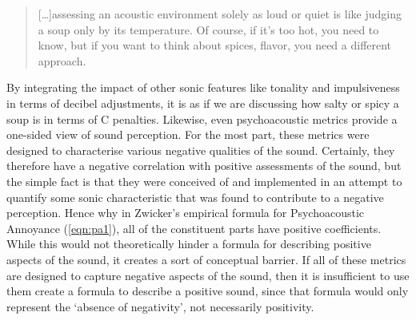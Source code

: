 \begin{samepage}
\begin{quote}
  [\ldots]assessing an acoustic environment solely as loud or quiet is like judging a soup only by its temperature. Of course, if it's too hot, you need to know, but if you want to think about spices, flavor, you need a different approach.
  \begin{flushright}
    \citet{OSullivan2021Pandemic}
  \end{flushright}
\end{quote}
\end{samepage}

By integrating the impact of other sonic features like tonality and impulsiveness in terms of decibel adjustments, it is as if we are discussing how salty or spicy a soup is in terms of \textdegree C penalties. Likewise, even psychoacoustic metrics provide a one-sided view of sound perception. For the most part, these metrics were designed to characterise various negative qualities of the sound. Certainly, they therefore have a negative correlation with positive assessments of the sound, but the simple fact is that they were conceived of and implemented in an attempt to quantify some sonic characteristic that was found to contribute to a negative perception. Hence why in Zwicker's empirical formula for Psychoacoustic Annoyance (\cref{eqn:pa1}), all of the constituent parts have positive coefficients. While this would not theoretically hinder a formula for describing positive aspects of the sound, it creates a sort of conceptual barrier. If all of these metrics are designed to capture negative aspects of the sound, then it is insufficient to use them create a formula to describe a positive sound, since that formula would only represent the `absence of negativity', not necessarily positivity.

